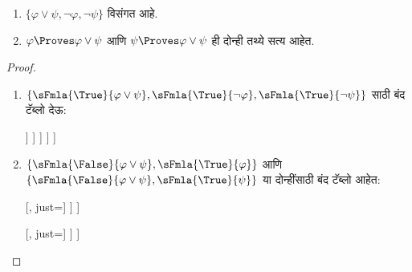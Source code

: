 \begin{prop}\label{fol:tab:ppr:prop:provability-lor}
  \begin{enumerate}
  \item $\{\varphi \lor \psi, \lnot \varphi, \lnot \psi\}$ विसंगत आहे.
  \item $\varphi \Proves \varphi \lor \psi$ आणि $\psi \Proves \varphi \lor \psi$ ही दोन्ही
    तथ्ये सत्य आहेत.
  \end{enumerate}
\end{prop}

\begin{proof}
  \begin{enumerate}
  \item $\{\sFmla{\True}{\varphi \lor \psi}, \sFmla{\True}{\lnot \varphi},
    \sFmla{\True}{\lnot \psi}\}$ साठी बंद टॅब्लो देऊ:
    \begin{oltableau}
      [\sFmla{\True}{\varphi \lor \psi}, just = \TAss
        [\sFmla{\True}{\lnot \varphi}, just = \TAss
          [\sFmla{\True}{\lnot \psi}, just = \TAss
            [\sFmla{\False}{\varphi}, just = {\TRule{\True}{\lnot}[2]}
              [\sFmla{\False}{\psi}, just = {\TRule{\True}{\lnot}[3]}
                [\sFmla{\True}{\varphi}, just = {\TRule{\True}{\lor}[1]}, close]
                [\sFmla{\True}{\psi}, just = {\TRule{\True}{\lor}[1]}, close]
              ]
            ]
          ]
        ]
      ]
    \end{oltableau}
  \item $\{\sFmla{\False}{\varphi \lor \psi}, \sFmla{\True}{\varphi}\}$ आणि
    $\{\sFmla{\False}{\varphi \lor \psi}, \sFmla{\True}{\psi}\}$ या दोन्हींसाठी
    बंद टॅब्लो आहेत:
    \begin{oltableau}{}
      [\sFmla{\False}{\varphi \lor \psi}, just=\TAss
        [\sFmla{\True}{\varphi}, just=\TAss
          [\sFmla{\False}{\varphi},just={\TRule{\False}{\lor}[1]}
            [\sFmla{\False}{\psi},just={\TRule{\False}{\lor}[1]}, close
            ]
          ]
        ]
      ]
    \end{oltableau}
    \begin{oltableau}{}
      [\sFmla{\False}{\varphi \lor \psi}, just=\TAss
        [\sFmla{\True}{\psi}, just=\TAss
          [\sFmla{\False}{\varphi},just={\TRule{\False}{\lor}[1]}
            [\sFmla{\False}{\psi},just={\TRule{\False}{\lor}[1]}, close
            ]
          ]
        ]
      ]
    \end{oltableau}
  \end{enumerate}
\end{proof}

